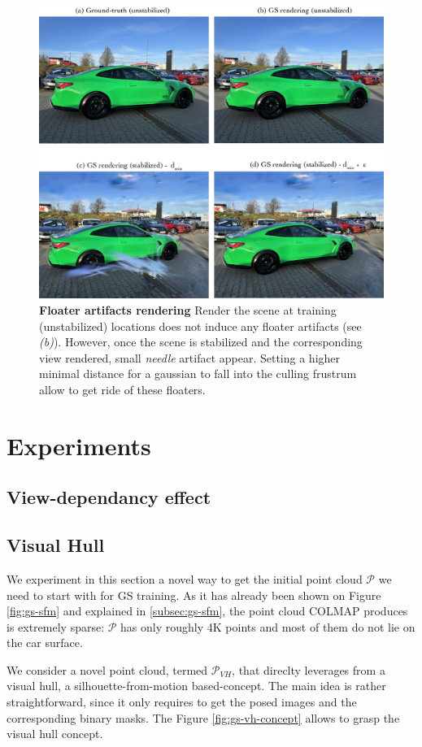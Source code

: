 \begin{figure}[htb!]
  \center
\includegraphics[width=.7\linewidth]{images/gaussiansplatting/gaussian-floaters-results.png}
\caption{\textbf{Floater artifacts rendering} Render the scene at training (unstabilized) locations does not induce any floater artifacts (see \textit{(b)}). However, once the scene is stabilized and the corresponding view rendered, small \textit{needle} artifact appear. Setting a higher minimal distance for a gaussian to fall into the culling frustrum allow to get ride of these floaters.}
\label{fig:gs-floaters}
\end{figure}



\section{Experiments}
\subsection{View-dependancy effect}

\subsection{Visual Hull}
We experiment in this section a novel way to get the initial point cloud $\mathcal{P}$ we need to start with for \ac{GS} training. As it has already been shown on Figure \ref{fig:gs-sfm} and explained in \ref{subsec:gs-sfm}, the point cloud COLMAP produces is extremely sparse: $\mathcal{P}$ has only roughly 4K points and most of them do not lie on the car surface. 

We consider a novel point cloud, termed $\mathcal{P}_{VH}$, that direclty leverages from a visual hull, a silhouette-from-motion based-concept. The main idea is rather straightforward, since it only requires to get the posed images and the corresponding binary masks. The Figure \ref{fig:gs-vh-concept} allows to grasp the visual hull concept. 

